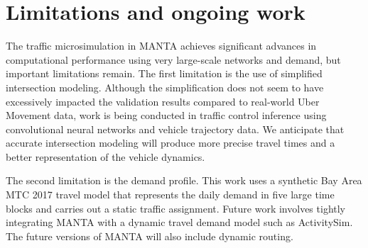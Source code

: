 \documentclass[final]{IEEEtran}
\begin{document}





\section{Limitations and ongoing work}

The traffic microsimulation in MANTA achieves significant advances in computational performance using very large-scale networks and demand, but important limitations remain. The first limitation is the use of simplified intersection modeling. Although the simplification does not seem to have excessively impacted the validation results compared to real-world Uber Movement data, work is being conducted in traffic control inference using convolutional neural networks and vehicle trajectory data. We anticipate that accurate intersection modeling will produce more precise travel times and a better representation of the vehicle dynamics.

The second limitation is the demand profile. This work uses a synthetic Bay Area MTC 2017 travel model that represents the daily demand in five large time blocks and carries out a static traffic assignment. Future work involves tightly integrating MANTA with a dynamic travel demand model such as ActivitySim. The future versions of MANTA will also include dynamic routing. %
\end{document}
